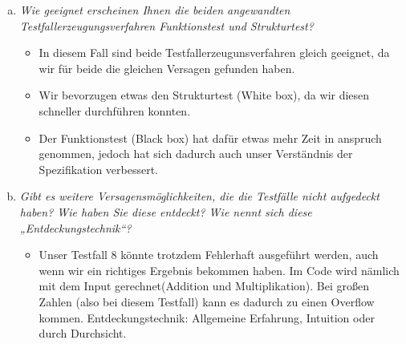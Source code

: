 \begin{enumerate}[(a)]
\item{\itshape Wie geeignet erscheinen Ihnen die beiden angewandten Testfallerzeugungsverfahren
Funktionstest und Strukturtest?}
    \begin{itemize}
        \item In diesem Fall sind beide Testfallerzeugunsverfahren gleich geeignet, da wir für beide die gleichen Versagen gefunden haben. 
        \item Wir bevorzugen etwas den Strukturtest (White box), da wir diesen schneller durchführen konnten.
        \item Der Funktionstest (Black box) hat dafür etwas mehr Zeit in anspruch genommen, jedoch hat sich dadurch auch unser Verständnis der Spezifikation verbessert.
    \end{itemize}


\item{\itshape Gibt es weitere Versagensmöglichkeiten, die die Testfälle nicht aufgedeckt haben? Wie
haben Sie diese entdeckt? Wie nennt sich diese „Entdeckungstechnik“?}
    \begin{itemize}
        \item Unser Testfall 8 könnte trotzdem Fehlerhaft ausgeführt werden, auch wenn wir ein richtiges Ergebnis bekommen haben. Im Code wird nämlich mit dem Input gerechnet(Addition und Multiplikation). Bei großen Zahlen (also bei diesem Testfall) kann es dadurch zu einen Overflow kommen. Entdeckungstechnik: Allgemeine Erfahrung, Intuition oder durch Durchsicht.
    \end{itemize}
    
    
\end{enumerate}


